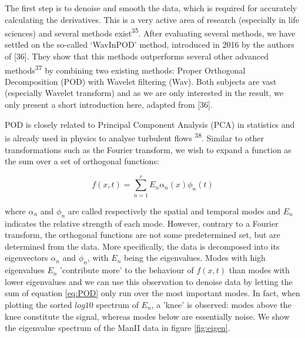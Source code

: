 \documentclass{Dissertate}
\begin{document}
The first step is to denoise and smooth the data, which is required for accurately calculating the derivatives.
This is a very active area of research (especially in life
sciences) and several methods exist\textsuperscript{35}. After
evaluating several methods, we have settled on the so-called `WavInPOD'
method, introduced in 2016 by the authors of [36]. They show that this methods
outperforms several other advanced methods\textsuperscript{37} by combining two existing methods: Proper
Orthogonal Decomposition (POD) with Wavelet filtering (Wav). Both
subjects are vast (especially Wavelet transform) and as we are only
interested in the result, we only present a short
introduction here, adapted from [36].

POD is closely related to Principal Component Analysis (PCA) in statistics and is already used in physics to analyse turbulent flows \textsuperscript{38}. Similar to other transformations such as the Fourier transform, we wish to expand a function as the sum over a set of orthogonal functions:

\begin{equation}
	\label{eq:POD}
	f(x,t)=\sum_{n=1}^r E_n\alpha_n(x)\phi_n(t)
\end{equation}


where \(\alpha_n\) and \(\phi_n\) are called respectively the spatial
and temporal modes and $E_n$ indicates the relative strength of each mode. However, contrary to a Fourier transform, the orthogonal functions are not some predetermined set, but are determined from the data. More specifically, the data is decomposed into its eigenvectors $\alpha_n$ and $\phi_n$, with $E_n$ being the eigenvalues. Modes with high eigenvalues $E_n$ 'contribute more' to the behaviour of $f(x,t)$ than modes with lower eigenvalues and we can use this observation to denoise data by letting the sum of equation \ref{eq:POD} only run over the most important modes. In fact, when plotting the sorted $log10$ spectrum of $E_n$, a 'knee' is observed: modes above the knee constitute the signal, whereas modes below are essentially noise.  We show the eigenvalue spectrum of the ManII data in figure \ref{fig:eigen}.
\end{document}
